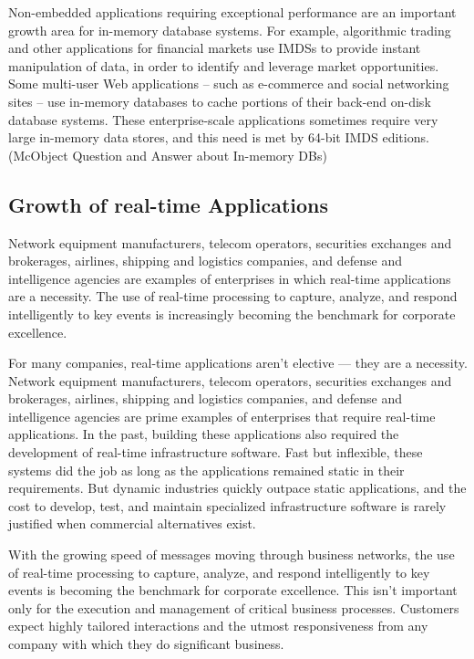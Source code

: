 \documentclass[12pt]{article} %
\begin{document}
Non-embedded applications requiring exceptional performance are an important growth area for in-memory database systems. For example, algorithmic trading and other applications for financial markets use IMDSs to provide instant manipulation of data, in order to identify and leverage market opportunities. Some multi-user Web applications – such as e-commerce and social networking sites – use in-memory databases to cache portions of their back-end on-disk database systems. These enterprise-scale applications sometimes require very large in-memory data stores, and this need is met by 64-bit IMDS editions.(McObject Question and Answer about In-memory DBs)

\subsection{Growth of real-time Applications}

Network equipment manufacturers, telecom operators, securities exchanges and brokerages, airlines, shipping and logistics companies, and defense and intelligence agencies are examples of enterprises in which real-time applications are a necessity. The use of real-time processing to capture, analyze, and respond intelligently to key events is increasingly becoming the benchmark for corporate excellence.

For many companies, real-time applications aren't elective — they are a necessity. Network equipment manufacturers, telecom operators, securities exchanges and brokerages, airlines, shipping and logistics companies, and defense and intelligence agencies are prime examples of enterprises that require real-time applications. In the past, building these applications also required the development of real-time infrastructure software. Fast but inflexible, these systems did the job as long as the applications remained static in their requirements. But dynamic industries quickly outpace static applications, and the cost to develop, test, and maintain  specialized infrastructure software is rarely justified when commercial alternatives exist.

With the growing speed of messages moving through business networks, the use of real-time processing to capture, analyze, and respond intelligently to key events is becoming the benchmark for corporate excellence. This isn’t important only for the execution and management of critical business processes. Customers expect highly tailored interactions and the utmost responsiveness from any company with which they do significant business.\\
\end{document}

